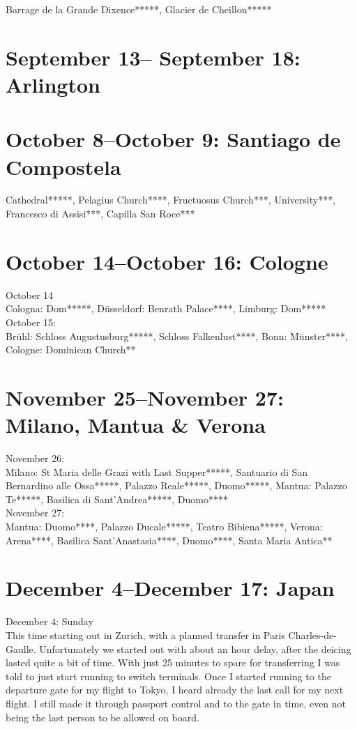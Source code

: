 Barrage de la Grande Dixence*****, Glacier de Cheillon*****

\section{September 13-- September 18: Arlington}
\label{Arlington2016}

\section{October 8--October 9: Santiago de Compostela}
\label{Santiago2016}

Cathedral*****, Pelagius Church****, Fructuosus Church***, University***, Francesco di Assisi***, Capilla San Roce***

\section{October 14--October 16: Cologne}
\label{Cologne2016}

October 14\\
Cologna: Dom*****, D\"usseldorf: Benrath Palace****, Limburg: Dom*****\\

October 15:\\
Br\"uhl: Schloss Augustusburg*****, Schloss Falkenlust****, Bonn: M\"unster****, Cologne: Dominican Church**

\section{November 25--November 27: Milano, Mantua \& Verona}
\label{Milano2016}

November 26:\\
Milano: St Maria delle Grazi with Last Supper*****, Santuario di San Bernardino alle Ossa*****, Palazzo Reale*****, Duomo*****, Mantua: Palazzo Te*****, Basilica di Sant'Andrea*****, Duomo****\\

November 27:\\
Mantua: Duomo****, Palazzo Ducale*****, Teatro Bibiena*****, Verona: Arena****, Basilica Sant'Anastasia****, Duomo****, Santa Maria Antica**

\section{December 4--December 17: Japan}
\label{Japan2016}

December 4: Sunday\\
This time starting out in Zurich, with a planned transfer in Paris Charles-de-Gaulle. Unfortunately we started out with about an hour delay, after the deicing lasted quite a bit of time. With just 25 minutes to spare for transferring I was told to just start running to switch terminals. Once I started running to the departure gate for my flight to Tokyo, I heard already the last call for my next flight. I still made it through passport control and to the gate in time, even not being the last person to be allowed on board.\\

